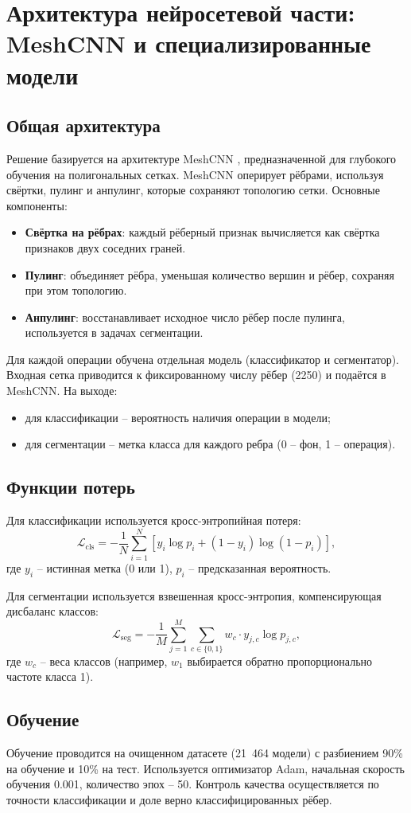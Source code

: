 \section{Архитектура нейросетевой части: MeshCNN и специализированные модели}

\subsection{Общая архитектура}
Решение базируется на архитектуре MeshCNN \cite{hanocka2019meshcnn}, предназначенной для глубокого обучения на полигональных сетках. MeshCNN оперирует рёбрами, используя свёртки, пулинг и анпулинг, которые сохраняют топологию сетки. Основные компоненты:
\begin{itemize}
    \item \textbf{Свёртка на рёбрах}: каждый рёберный признак вычисляется как свёртка признаков двух соседних граней.
    \item \textbf{Пулинг}: объединяет рёбра, уменьшая количество вершин и рёбер, сохраняя при этом топологию.
    \item \textbf{Анпулинг}: восстанавливает исходное число рёбер после пулинга, используется в задачах сегментации.
\end{itemize}

Для каждой операции обучена отдельная модель (классификатор и сегментатор). Входная сетка приводится к фиксированному числу рёбер (2250) и подаётся в MeshCNN. На выходе:
\begin{itemize}
    \item для классификации – вероятность наличия операции в модели;
    \item для сегментации – метка класса для каждого ребра (0 – фон, 1 – операция).
\end{itemize}

\subsection{Функции потерь}
Для классификации используется кросс-энтропийная потеря:
\[
\mathcal{L}_{\text{cls}} = -\frac{1}{N}\sum_{i=1}^{N}\left[y_i\log p_i + (1-y_i)\log(1-p_i)\right],
\]
где $y_i$ – истинная метка (0 или 1), $p_i$ – предсказанная вероятность.

Для сегментации используется взвешенная кросс-энтропия, компенсирующая дисбаланс классов:
\[
\mathcal{L}_{\text{seg}} = -\frac{1}{M}\sum_{j=1}^{M}\sum_{c\in\{0,1\}} w_c \cdot y_{j,c} \log p_{j,c},
\]
где $w_c$ – веса классов (например, $w_1$ выбирается обратно пропорционально частоте класса 1).

\subsection{Обучение}
Обучение проводится на очищенном датасете (21~464 модели) с разбиением 90\% на обучение и 10\% на тест. Используется оптимизатор Adam, начальная скорость обучения 0.001, количество эпох – 50. Контроль качества осуществляется по точности классификации и доле верно классифицированных рёбер.

